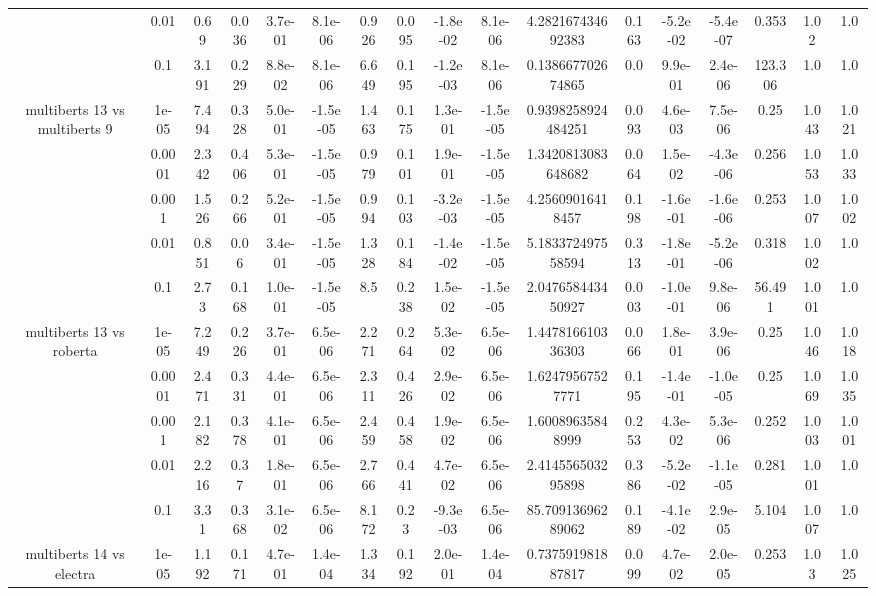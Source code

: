 \begin{tabular}{|c|c|c|c|c|c|c|c|c|c|c|c|c|c|c|c|c|}
 & 0.01 & 0.69 & 0.036 & 3.7e-01 & 8.1e-06 & 0.926 & 0.095 & -1.8e-02 & 8.1e-06 & 4.282167434692383 & 0.163 & -5.2e-02 & -5.4e-07 & 0.353 & 1.02 & 1.0 \\
 & 0.1 & 3.191 & 0.229 & 8.8e-02 & 8.1e-06 & 6.649 & 0.195 & -1.2e-03 & 8.1e-06 & 0.138667702674865 & 0.0 & 9.9e-01 & 2.4e-06 & 123.306 & 1.0 & 1.0 \\
\hline
\multirow{5}{*}{multiberts 13 vs multiberts 9} & 1e-05 & 7.494 & 0.328 & 5.0e-01 & -1.5e-05 & 1.463 & 0.175 & 1.3e-01 & -1.5e-05 & 0.9398258924484251 & 0.093 & 4.6e-03 & 7.5e-06 & 0.25 & 1.043 & 1.021 \\
 & 0.0001 & 2.342 & 0.406 & 5.3e-01 & -1.5e-05 & 0.979 & 0.101 & 1.9e-01 & -1.5e-05 & 1.3420813083648682 & 0.064 & 1.5e-02 & -4.3e-06 & 0.256 & 1.053 & 1.033 \\
 & 0.001 & 1.526 & 0.266 & 5.2e-01 & -1.5e-05 & 0.994 & 0.103 & -3.2e-03 & -1.5e-05 & 4.25609016418457 & 0.198 & -1.6e-01 & -1.6e-06 & 0.253 & 1.007 & 1.002 \\
 & 0.01 & 0.851 & 0.06 & 3.4e-01 & -1.5e-05 & 1.328 & 0.184 & -1.4e-02 & -1.5e-05 & 5.183372497558594 & 0.313 & -1.8e-01 & -5.2e-06 & 0.318 & 1.002 & 1.0 \\
 & 0.1 & 2.73 & 0.168 & 1.0e-01 & -1.5e-05 & 8.5 & 0.238 & 1.5e-02 & -1.5e-05 & 2.047658443450927 & 0.003 & -1.0e-01 & 9.8e-06 & 56.491 & 1.001 & 1.0 \\
\hline
\multirow{5}{*}{multiberts 13 vs roberta } & 1e-05 & 7.249 & 0.226 & 3.7e-01 & 6.5e-06 & 2.271 & 0.264 & 5.3e-02 & 6.5e-06 & 1.447816610336303 & 0.066 & 1.8e-01 & 3.9e-06 & 0.25 & 1.046 & 1.018 \\
 & 0.0001 & 2.471 & 0.331 & 4.4e-01 & 6.5e-06 & 2.311 & 0.426 & 2.9e-02 & 6.5e-06 & 1.62479567527771 & 0.195 & -1.4e-01 & -1.0e-05 & 0.25 & 1.069 & 1.035 \\
 & 0.001 & 2.182 & 0.378 & 4.1e-01 & 6.5e-06 & 2.459 & 0.458 & 1.9e-02 & 6.5e-06 & 1.60089635848999 & 0.253 & 4.3e-02 & 5.3e-06 & 0.252 & 1.003 & 1.001 \\
 & 0.01 & 2.216 & 0.37 & 1.8e-01 & 6.5e-06 & 2.766 & 0.441 & 4.7e-02 & 6.5e-06 & 2.414556503295898 & 0.386 & -5.2e-02 & -1.1e-05 & 0.281 & 1.001 & 1.0 \\
 & 0.1 & 3.31 & 0.368 & 3.1e-02 & 6.5e-06 & 8.172 & 0.23 & -9.3e-03 & 6.5e-06 & 85.70913696289062 & 0.189 & -4.1e-02 & 2.9e-05 & 5.104 & 1.007 & 1.0 \\
\hline
\multirow{5}{*}{multiberts 14 vs electra } & 1e-05 & 1.192 & 0.171 & 4.7e-01 & 1.4e-04 & 1.334 & 0.192 & 2.0e-01 & 1.4e-04 & 0.737591981887817 & 0.099 & 4.7e-02 & 2.0e-05 & 0.253 & 1.03 & 1.025 \\

\end{tabular}
